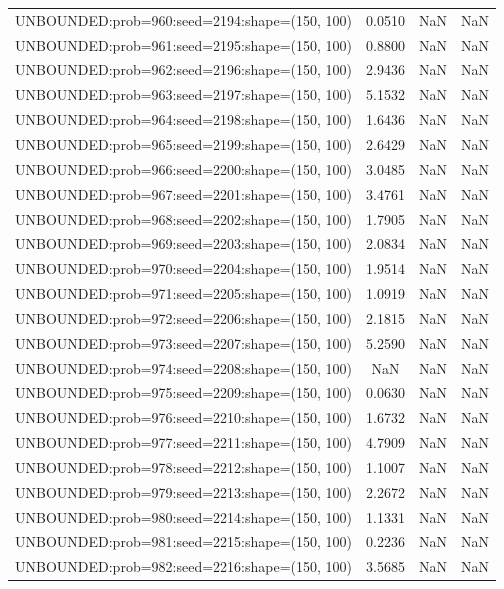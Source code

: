 \begin{longtable}{lccc}
UNBOUNDED:prob=960:seed=2194:shape=(150, 100) &  0.0510 &   NaN &    NaN \\
UNBOUNDED:prob=961:seed=2195:shape=(150, 100) &  0.8800 &   NaN &    NaN \\
UNBOUNDED:prob=962:seed=2196:shape=(150, 100) &  2.9436 &   NaN &    NaN \\
UNBOUNDED:prob=963:seed=2197:shape=(150, 100) &  5.1532 &   NaN &    NaN \\
UNBOUNDED:prob=964:seed=2198:shape=(150, 100) &  1.6436 &   NaN &    NaN \\
UNBOUNDED:prob=965:seed=2199:shape=(150, 100) &  2.6429 &   NaN &    NaN \\
UNBOUNDED:prob=966:seed=2200:shape=(150, 100) &  3.0485 &   NaN &    NaN \\
UNBOUNDED:prob=967:seed=2201:shape=(150, 100) &  3.4761 &   NaN &    NaN \\
UNBOUNDED:prob=968:seed=2202:shape=(150, 100) &  1.7905 &   NaN &    NaN \\
UNBOUNDED:prob=969:seed=2203:shape=(150, 100) &  2.0834 &   NaN &    NaN \\
UNBOUNDED:prob=970:seed=2204:shape=(150, 100) &  1.9514 &   NaN &    NaN \\
UNBOUNDED:prob=971:seed=2205:shape=(150, 100) &  1.0919 &   NaN &    NaN \\
UNBOUNDED:prob=972:seed=2206:shape=(150, 100) &  2.1815 &   NaN &    NaN \\
UNBOUNDED:prob=973:seed=2207:shape=(150, 100) &  5.2590 &   NaN &    NaN \\
UNBOUNDED:prob=974:seed=2208:shape=(150, 100) &     NaN &   NaN &    NaN \\
UNBOUNDED:prob=975:seed=2209:shape=(150, 100) &  0.0630 &   NaN &    NaN \\
UNBOUNDED:prob=976:seed=2210:shape=(150, 100) &  1.6732 &   NaN &    NaN \\
UNBOUNDED:prob=977:seed=2211:shape=(150, 100) &  4.7909 &   NaN &    NaN \\
UNBOUNDED:prob=978:seed=2212:shape=(150, 100) &  1.1007 &   NaN &    NaN \\
UNBOUNDED:prob=979:seed=2213:shape=(150, 100) &  2.2672 &   NaN &    NaN \\
UNBOUNDED:prob=980:seed=2214:shape=(150, 100) &  1.1331 &   NaN &    NaN \\
UNBOUNDED:prob=981:seed=2215:shape=(150, 100) &  0.2236 &   NaN &    NaN \\
UNBOUNDED:prob=982:seed=2216:shape=(150, 100) &  3.5685 &   NaN &    NaN \\

\end{longtable}

